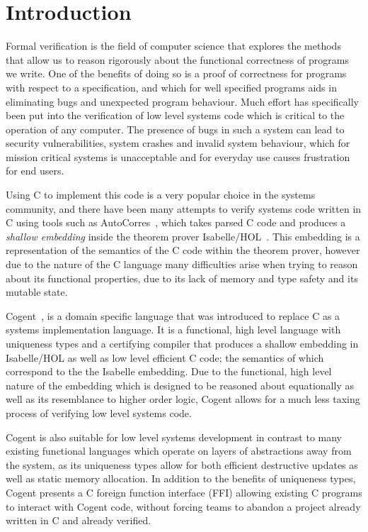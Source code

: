 \chapter{Introduction}\label{ch:intro}

Formal verification is the field of computer science that explores the methods that allow us to
  reason rigorously about the functional correctness of programs we write.
One of the benefits of doing so is a proof of correctness for programs with respect to a specification,
  and which for well specified programs aids in eliminating bugs and unexpected program behaviour.
Much effort has specifically been put into the verification of low level systems code
  which is critical to the operation of any computer.
The presence of bugs in such a system can lead to security vulnerabilities,
  system crashes and invalid system behaviour, which for mission critical systems is unacceptable and
  for everyday use causes frustration for end users.

Using C to implement this code is a very popular choice in the systems community,
  and there have been many attempts to verify systems code written in C using tools such as 
  AutoCorres~\citep{AutoCorres}, which takes parsed C code and produces a \textit{shallow embedding}
  inside the theorem prover Isabelle/HOL~\citep{IsabelleTutorial}.
This embedding is a representation of the semantics of the C code within the theorem prover,
  however due to the nature of the C language many difficulties arise when trying to
  reason about its functional properties, due to its lack of memory and type safety 
  and its mutable state.

Cogent~\citep{ICFPCogent}, is a domain specific language that was introduced to replace C as a systems
  implementation language.
It is a functional, high level language with uniqueness types and a certifying compiler
  that produces a shallow embedding in Isabelle/HOL as well as low level efficient C code;
  the semantics of which correspond to the the Isabelle embedding.
Due to the functional, high level nature of the embedding 
  which is designed to be reasoned about equationally as well as its resemblance to higher order logic,
  Cogent allows for a much less taxing process of verifying low level systems code.

Cogent is also suitable for low level systems development in contrast to many existing functional languages which operate
  on layers of abstractions away from the system, as its uniqueness types allow for both efficient destructive updates
  as well as static memory allocation.
In addition to the benefits of uniqueness types, Cogent presents a C foreign function interface (FFI) allowing existing C programs
 to interact with Cogent code, without forcing teams to abandon a project already written in C and already verified.

